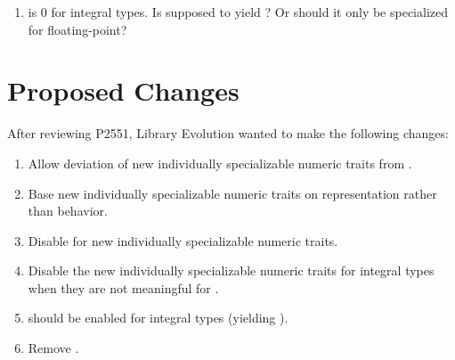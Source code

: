 \begin{enumerate}
  \item {} is 0 for integral types.
  Is  supposed to yield ?
  Or should it only be specialized for floating-point?
\end{enumerate}

\section{Proposed Changes}
After reviewing P2551, Library Evolution wanted to make the following changes:

\begin{enumerate}
  \item Allow deviation of new individually specializable numeric traits from .
  \item Base new individually specializable numeric traits on representation rather than behavior.
  \item Disable  for new individually specializable numeric traits.
  \item Disable the new individually specializable numeric traits for integral types when they are not meaningful for .
  \item {} should be enabled for integral types (yielding ).
  \item Remove .
\end{enumerate}






